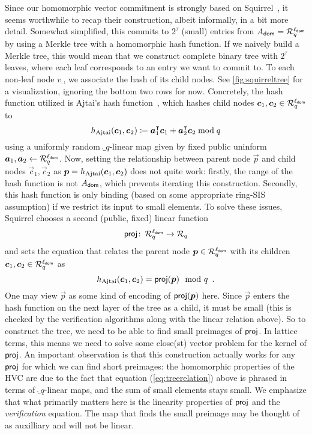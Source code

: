 Since our homomorphic vector commitment is strongly based on Squirrel~\cite{CCS:FleSimZha22}, it seems worthwhile to recap their construction, albeit informally, in a bit more detail.
Somewhat simplified, this commits to $2^\tau$ (small) entries from $A_{\mathsf{dom}} = \mathcal{R}_q^{\ell_{\mathsf{dom}}}$ by using a Merkle tree with a homomorphic hash function.
If we naively build a Merkle tree, this would mean that we construct complete binary tree with $2^\tau$ leaves, where each leaf corresponds to an entry we want to commit to.
To each non-leaf node $v_{.}$, we associate the hash of its child nodes.
See \autoref{fig:squirreltree} for a visualization, ignoring the bottom two rows for now.
Concretely, the hash function utilized is Ajtai's hash function~\cite{ICALP:Ajtai99}, which hashes child nodes $\boldsymbol{c}_1, \boldsymbol{c}_2\in\mathcal{R}_q^{\ell_{\mathsf{dom}}}$ to
\[
h_\mathrm{Ajtai}(\boldsymbol{c}_1,\boldsymbol{c}_2) \coloneqq \boldsymbol{a}_1^\intercal \boldsymbol{c}_1 + \boldsymbol{a}_2^\intercal \boldsymbol{c}_2 \bmod q
\]
using a uniformly random $\ring_q$-linear map given by fixed public uninform $\boldsymbol{a}_1,\boldsymbol{a}_2\gets \mathcal{R}_q^{\ell_{\mathsf{dom}}}$.
Now, setting the relationship between parent node $\vec{p}$ and child nodes $\vec{c}_1, \vec{c}_2$ as $\boldsymbol{p}=h_\mathrm{Ajtai}(\boldsymbol{c}_1,\boldsymbol{c}_2)$ does not quite work: firstly, the range of the hash function is not $A_{\mathsf{dom}}$, which prevents iterating this construction.
Secondly, this hash function is only binding (based on some appropriate ring-SIS assumption) if we restrict its input to small elements.
To solve these issues, Squirrel chooses a second (public, fixed) linear function
\[
\mathsf{proj}\colon\,\mathcal{R}_q^{\ell_{\mathsf{dom}}} \to \mathcal{R}_q
\]
and sets the equation that relates the parent node $\boldsymbol{p}\in\mathcal{R}_q^{\ell_{\mathsf{dom}}}$ with its children $\boldsymbol{c}_1,\boldsymbol{c}_2\in\mathcal{R}_q^{\ell_{\mathsf{dom}}}$ as
\begin{equation}
h_\mathrm{Ajtai}(\boldsymbol{c}_1,\boldsymbol{c}_2) = \mathsf{proj}(\boldsymbol{p}) \mod q\enspace. \label{eq:treerelation}
\end{equation}
%
One may view $\vec{p}$ as some kind of encoding of $\mathsf{proj}(\boldsymbol{p})$ here. Since $\vec{p}$ enters the hash function on the next layer of the tree as a child, it must be small (this is checked by the verification algorithms along with the linear relation above).
So to construct the tree, we need to be able to find small preimages of $\mathsf{proj}$.
In lattice terms, this means we need to solve some close(st) vector problem for the kernel of $\mathsf{proj}$.
An important observation is that this construction actually works for any $\mathsf{proj}$ for which we can find short preimages:
the homomorphic properties of the HVC are due to the fact that equation (\ref{eq:treerelation}) above
is phrased in terms of $\ring_q$-linear maps, and the sum of small elements stays small.
We emphasize that what primarily matters here is the linearity properties of $\mathsf{proj}$ and the \emph{verification} equation. The map that finds the small preimage may be thought of as auxilliary and will not be linear.


